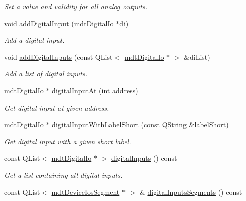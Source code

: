 \begin{DoxyCompactItemize}
\begin{DoxyCompactList}\small\item\em Set a value and validity for all analog outputs. \end{DoxyCompactList}\item 
void \hyperlink{classmdt_device_ios_a023571f5d77bd0874c08b53890a56381}{addDigitalInput} (\hyperlink{classmdt_digital_io}{mdtDigitalIo} $\ast$di)
\begin{DoxyCompactList}\small\item\em Add a digital input. \end{DoxyCompactList}\item 
void \hyperlink{classmdt_device_ios_a470c27db1fefa6cd2a4a690bb0ff04f5}{addDigitalInputs} (const QList$<$ \hyperlink{classmdt_digital_io}{mdtDigitalIo} $\ast$ $>$ \&diList)
\begin{DoxyCompactList}\small\item\em Add a list of digital inputs. \end{DoxyCompactList}\item 
\hyperlink{classmdt_digital_io}{mdtDigitalIo} $\ast$ \hyperlink{classmdt_device_ios_a78f68d0efeac0a23628f133121f28df8}{digitalInputAt} (int address)
\begin{DoxyCompactList}\small\item\em Get digital input at given address. \end{DoxyCompactList}\item 
\hyperlink{classmdt_digital_io}{mdtDigitalIo} $\ast$ \hyperlink{classmdt_device_ios_abcde6de5a0ca6d642af04c21250d6555}{digitalInputWithLabelShort} (const QString \&labelShort)
\begin{DoxyCompactList}\small\item\em Get digital input with a given short label. \end{DoxyCompactList}\item 
const QList$<$ \hyperlink{classmdt_digital_io}{mdtDigitalIo} $\ast$ $>$ \hyperlink{classmdt_device_ios_adb2cbcd4adcee1e9434634694ee1ae24}{digitalInputs} () const 
\begin{DoxyCompactList}\small\item\em Get a list containing all digital inputs. \end{DoxyCompactList}\item 
\hypertarget{classmdt_device_ios_adc81519c2e6edc7fe54663c77d6eb503}{
const QList$<$ \hyperlink{classmdt_device_ios_segment}{mdtDeviceIosSegment} $\ast$ $>$ \& \hyperlink{classmdt_device_ios_adc81519c2e6edc7fe54663c77d6eb503}{digitalInputsSegments} () const }
\label{classmdt_device_ios_adc81519c2e6edc7fe54663c77d6eb503}


\end{DoxyCompactItemize}
